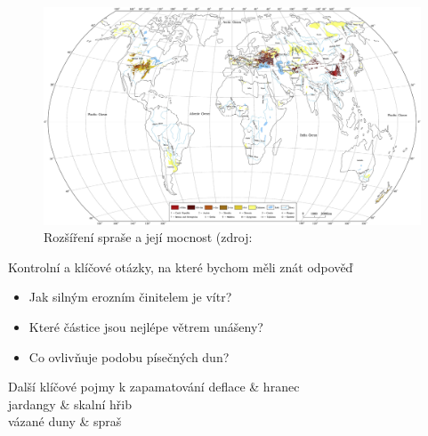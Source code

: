 \begin{landscape}
	\begin{figure}
		\centering
		\includegraphics[width=1\linewidth]{obrazky/eolicka/loes_distr}
		\caption{Rozšíření spraše a její mocnost (zdroj: \textcite{liLoessGenesisWorldwide2020}}
		\label{fig:spras_distribuce}
	\end{figure}
\end{landscape}


\newpage
\onecolumn
\begin{boxotazky}{Kontrolní a klíčové otázky, na které bychom měli znát odpověď}
	\begin{itemize}
		\item Jak silným erozním činitelem je vítr?
		\item Které částice jsou nejlépe větrem unášeny?
		\item Co ovlivňuje podobu písečných dun?
		
	\end{itemize}
\end{boxotazky}

\begin{boxslovnik}{Další klíčové pojmy k zapamatování}
	deflace & hranec \\
	jardangy & skalní  hřib \\
	vázané duny & spraš \\
	
\end{boxslovnik}
\twocolumn
